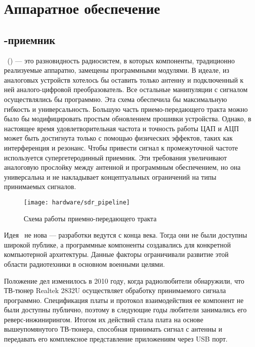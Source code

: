 \section{Аппаратное обеспечение}
\label{sec:hardware}


\subsection{\SDR-приемник}

\sdr\ (\SDR) --- это разновидность радиосистем, в которых компоненты, традиционно реализуемые аппаратно, замещены программными модулями.
В идеале, из аналоговых устройств хотелось бы оставить только антенну и подключенный к ней аналого-цифровой преобразователь. Все остальные манипуляции с сигналом осуществлялись бы программно. Эта схема обеспечила бы максимальную гибкость и универсальность. Большую часть приемо-передающего тракта можно было бы модифицировать простым обновлением прошивки устройства.
Однако, в настоящее время удовлетворительная частота и точность работы ЦАП и АЦП может быть достигнута только с помощью физических эффектов, таких как интерференция и резонанс. Чтобы привести сигнал к промежуточной частоте используется супергетеродинный приемник. Эти требования увеличивают аналоговую прослойку между антенной и программным обеспечением, но она универсальна и не накладывает концептуальных ограничений на типы принимаемых сигналов.

\begin{figure}[h]
  \centering
  \texttt{[image: hardware/sdr\_pipeline]}
  \caption{Схема работы приемно-передающего тракта \SDR\ \cite{sdr_wiki}}
  \label{fig:hardware:sdr_pipeline}
\end{figure}

Идея \SDR\ не нова --- разработки ведутся с конца  века. Тогда они не были доступны широкой публике, а программные компоненты создавались для конкретной компьютерной архитектуры. Данные факторы ограничивали развитие этой области радиотехники в основном военными целями.

Положение дел изменилось в 2010 году, когда радиолюбители обнаружили, что ТВ-тюнер Realtek 2832U осуществляет обработку принимаемого сигнала программно. Спецификация платы и протокол взаимодействия ее компонент не были доступны публично, поэтому в следующие годы любители занимались его реверс-инжинирингом. Итогом их действий стала плата на основе вышеупомянутого ТВ-тюнера, способная принимать сигнал с антенны и передавать его комплексное представление приложениям через USB порт.

